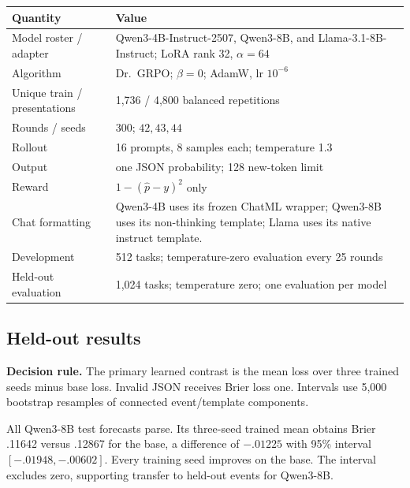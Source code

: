 \begin{center}
\begin{minipage}{\linewidth}
\centering
{}
\label{tab:exp3b-hparams}
\scriptsize
\begin{tabular}{p{.34\linewidth}p{.59\linewidth}}
\toprule
\textbf{Quantity} & \textbf{Value} \\
\midrule
Model roster / adapter & Qwen3-4B-Instruct-2507, Qwen3-8B, and
Llama-3.1-8B-Instruct; LoRA rank 32, $\alpha=64$ \\
Algorithm & Dr.~GRPO; $\beta=0$; AdamW, lr $10^{-6}$ \\
Unique train / presentations & 1,736 / 4,800 balanced repetitions \\
Rounds / seeds & 300; $42,43,44$ \\
Rollout & 16 prompts, 8 samples each; temperature 1.3 \\
Output & one JSON probability; 128 new-token limit \\
Reward & $1-(\hat p-y)^2$ only \\
Chat formatting & Qwen3-4B uses its frozen ChatML wrapper; Qwen3-8B uses
its non-thinking template; Llama uses its native instruct template. \\
Development & 512 tasks; temperature-zero evaluation every 25 rounds \\
Held-out evaluation & 1,024 tasks; temperature zero; one evaluation per model \\
\bottomrule
\end{tabular}
\end{minipage}
\end{center}

\subsection{Held-out results}
\label{app:exp3b-results}
\noindent\textbf{Decision rule.}
The primary learned contrast is the mean loss over three trained seeds minus base
loss. Invalid JSON receives Brier loss one. Intervals use 5,000 bootstrap
resamples of connected event/template components.

All Qwen3-8B test forecasts parse. Its three-seed trained mean obtains Brier
.11642 versus .12867 for the base, a difference of $-.01225$ with 95\% interval
$[-.01948,-.00602]$. Every training seed improves on the base. The interval
excludes zero, supporting transfer to held-out events for Qwen3-8B.

